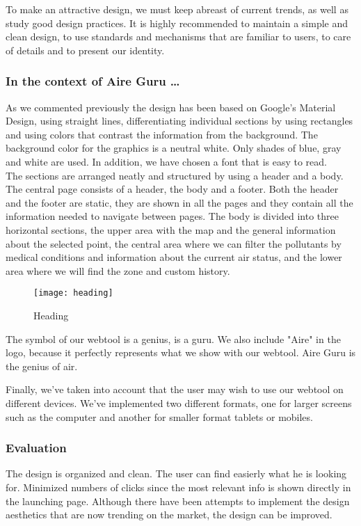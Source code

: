 To make an attractive design, we must keep abreast of current trends, as well as study good design practices.
It is highly recommended to maintain a simple and clean design, to use standards and mechanisms that are familiar to users,
to care of details and to present our identity.

\subsubsection*{In the context of Aire Guru \ldots}

As we commented previously the design has been based on Google's Material Design, using straight lines, differentiating individual sections by using rectangles and using colors that contrast the information from the background.
The background color for the graphics is a neutral white. Only shades of blue, gray and white are used. In addition, we have chosen a font that is easy to read.\\

The sections are arranged neatly and structured by using a header and a body.\\

The central page consists of a header, the body and a footer. Both the header and the footer are static,
they are shown in all the pages and they contain all the information needed to navigate between pages.
The body is divided into three horizontal sections, the upper area with the map and the general information about the selected point,
the central area where we can filter the pollutants by medical conditions and information about the current air status, and the
lower area where we will find the zone and custom history.

\begin{figure}[ht]
    \centering
    \texttt{[image: heading]}
    \caption{Heading}
\end{figure}
 
    The symbol of our webtool is a genius, is a guru. We also include "Aire" in the logo, because it perfectly represents 
    what we show with our webtool. Aire Guru is the genius of air.
    
    Finally, we've taken into account that the user may wish to use our webtool on different devices. We've implemented
    two different formats, one for larger screens such as the computer and another for smaller format tablets or mobiles.

\subsubsection*{Evaluation}  

\begin{itemize}
    \done The design is organized and clean. 
    \done The user can find easierly what he is looking for.
    \done Minimized numbers of clicks since the most relevant info is shown directly in the launching page.
    \crossed Although there have been attempts to implement the design aesthetics that are now trending on the market, the design can be improved.
\end{itemize}